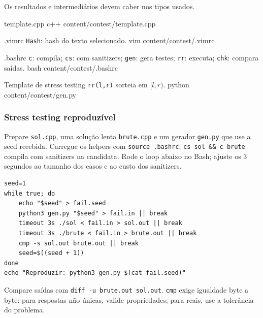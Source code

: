 Os resultados e intermediários devem caber nos tipos usados.

\mintedentry
{template.cpp}
{}
{}
{c++}
{content/contest/template.cpp}

\mintedentry
{.vimrc}
{}
{\texttt{Hash}: hash do texto selecionado.}
{vim}
{content/contest/.vimrc}

\mintedentry
{.bashrc}
{}
{\texttt{c}: compila; \texttt{cs}: com sanitizers; \texttt{gen}: gera testes; \texttt{rr}: executa; \texttt{chk}: compara saídas.}
{bash}
{content/contest/.bashrc}

\mintedentry
{Template de stress testing}
{}
{\texttt{rr(l,r)} sorteia em $[l,r)$.}
{python}
{content/contest/gen.py}

\ifextended
\subsubsection{Stress testing reproduzível}
Prepare \texttt{sol.cpp}, uma solução lenta \texttt{brute.cpp} e um gerador
\texttt{gen.py} que use a seed recebida. Carregue os helpers com
\texttt{source .bashrc}; \texttt{cs sol \&\& c brute} compila com sanitizers
na candidata. Rode o loop abaixo no Bash; ajuste os 3 segundos ao tamanho
dos casos e ao custo dos sanitizers.
\begin{verbatim}
seed=1
while true; do
    echo "$seed" > fail.seed
    python3 gen.py "$seed" > fail.in || break
    timeout 3s ./sol < fail.in > sol.out || break
    timeout 3s ./brute < fail.in > brute.out || break
    cmp -s sol.out brute.out || break
    seed=$((seed + 1))
done
echo "Reproduzir: python3 gen.py $(cat fail.seed)"
\end{verbatim}
Compare saídas com \texttt{diff -u brute.out sol.out}.
\texttt{cmp} exige igualdade byte a byte: para respostas não únicas, valide
propriedades; para reais, use a tolerância do problema.
\fi
